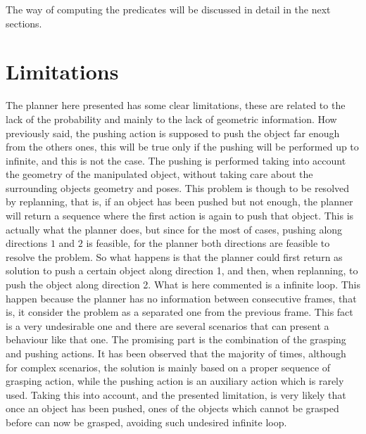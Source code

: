 \mbox{}

The way of computing the predicates will be discussed in detail in the next sections.



\section{Limitations}
The planner here presented has some clear limitations, these are related to the lack of the probability and mainly to the lack of geometric information. 
How previously said, the pushing action is supposed to push the object far enough from the others ones, this will be true only if the pushing will be performed up to infinite, and this is not the case. The pushing is performed taking into account the geometry of the manipulated object, without taking care about the surrounding objects geometry and poses. This problem is though to be resolved by replanning, that is, if an object has been pushed but not enough, the planner will return a sequence where the first action is again to push that object. This is actually what the planner does, but since for the most of cases, pushing along directions $1$ and $2$ is feasible, for the planner both directions are feasible to resolve the problem. So what happens is that the planner could first return as solution to push a certain object along direction 1, and then, when replanning, to push the object along direction 2. What is here commented is a infinite loop. This happen because the planner has no information between consecutive frames, that is, it consider the problem as a separated one from the previous frame. 
This fact is a very undesirable one and there are several scenarios that can present a behaviour like that one. The promising part is the combination of the grasping and pushing actions. It has been observed that the majority of times, although for complex scenarios, the solution is mainly based on a proper sequence of grasping action, while the pushing action is an auxiliary action which is rarely used. Taking this into account, and the presented limitation, is very likely that once an object has been pushed, ones of the objects which cannot be grasped before can now be grasped, avoiding such undesired infinite loop.  


